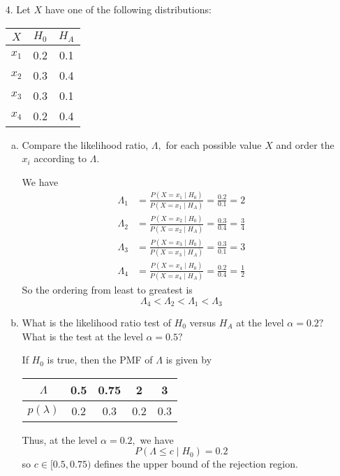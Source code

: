 \documentclass{article}
\begin{document}
\begin{itemize}
	\item[4.] Let $X$ have one of the following distributions:
		\begin{center}
			\begin{tabular}{ccc}
				$X$ & $H_0$ & $H_A$ \\
				\hline
				$x_1$ & 0.2 & 0.1 \\
				$x_2$ & 0.3 & 0.4 \\
				$x_3$ & 0.3 & 0.1 \\
				$x_4$ & 0.2 & 0.4
			\end{tabular}
		\end{center}

		\begin{enumerate}[a.]
			\item Compare the likelihood ratio, $\Lambda,$ for each possible value $X$ and order the $x_i$ according to $\Lambda.$
				\begin{soln}
					We have 
					\begin{align*}
						\Lambda_1 &= \frac{P(X=x_1\mid H_0)}{P(X=x_1\mid H_A)} = \frac{0.2}{0.1} = 2 \\
						\Lambda_2 &= \frac{P(X=x_2\mid H_0)}{P(X=x_2\mid H_A)}=\frac{0.3}{0.4}=\frac{3}{4} \\
						\Lambda_3 &= \frac{P(X=x_3\mid H_0)}{P(X=x_3\mid H_A)} = \frac{0.3}{0.1} = 3 \\
						\Lambda_4 &= \frac{P(X=x_4\mid H_0)}{P(X=x_4\mid H_A)} = \frac{0.2}{0.4}=\frac{1}{2}
					\end{align*}
					So the ordering from least to greatest is \[\Lambda_4<\Lambda_2<\Lambda_1<\Lambda_3\]
				\end{soln}

			\item What is the likelihood ratio test of $H_0$ versus $H_A$ at the level $\alpha=0.2?$ What is the test at the level $\alpha=0.5?$
				\begin{soln}
					If $H_0$ is true, then the PMF of $\Lambda$ is given by 
					\begin{center}
						\begin{tabular}{c||c|c|c|c}
							$\Lambda$ & 0.5 & 0.75 & 2 & 3 \\
							\hline
							$p(\lambda)$ & 0.2 & 0.3 & 0.2 & 0.3
						\end{tabular}
					\end{center}
					Thus, at the level $\alpha=0.2,$ we have \[P(\Lambda\le c \mid H_0) = 0.2\] so $c\in [0.5, 0.75)$ defines the upper bound of the rejection region.
						

\end{soln}
\end{enumerate}
\end{itemize}
\end{document}
